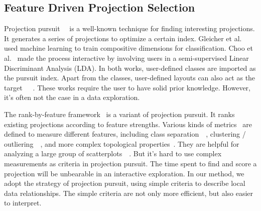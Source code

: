 \subsection{Feature Driven Projection Selection}
Projection pursuit~\cite{DBLP:journals/tc/FriedmanT74}~\cite{cook1995grand} is a well-known technique for finding interesting projections. It generates a series of projections to optimize a certain index. Gleicher et al.~\cite{DBLP:journals/tvcg/Gleicher13} used machine learning to train compositive dimensions for classification. Choo et al.~\cite{DBLP:conf/ieeevast/ChooLKP10} made the process interactive by involving users in a semi-supervised Linear Discriminant Analysis (LDA). In both works, user-defined classes are imported as the pursuit index. Apart from the classes, user-defined layouts can also act as the target~\cite{DBLP:journals/tvcg/JoiaCCPN11}~\cite{DBLP:conf/ieeevast/BrownLBC12}~\cite{DBLP:journals/tvcg/HuBMHNL13}. These works require the user to have solid prior knowledge. However, it's often not the case in a data exploration.

The rank-by-feature framework~\cite{DBLP:journals/ivs/SeoS05} is a variant of projection pursuit. It ranks existing projections according to feature strengths. Various kinds of metrics~\cite{DBLP:conf/ieeevast/AlbuquerqueEM11} are defined to measure different features, including class separation~\cite{DBLP:journals/cgf/SipsNLH09}~\cite{DBLP:journals/cgf/SedlmairTMT12}, clustering / outliering~\cite{DBLP:conf/ieeevast/TatuAESTMK09}~\cite{DBLP:journals/tvcg/JohanssonJ09}, and more complex topological properties~\cite{DBLP:conf/infovis/WilkinsonAG05}. They are helpful for analyzing a large group of scatterplots~\cite{DBLP:conf/apvis/NhonW14}~\cite{DBLP:conf/ieeevast/AnandWN12}. But it's hard to use complex measurements as criteria in projection pursuit. The time spent to find and score a projection will be unbearable in an interactive exploration. In our method, we adopt the strategy of projection pursuit, using simple criteria to describe local data relationships. The simple criteria are not only more efficient, but also easier to interpret.

